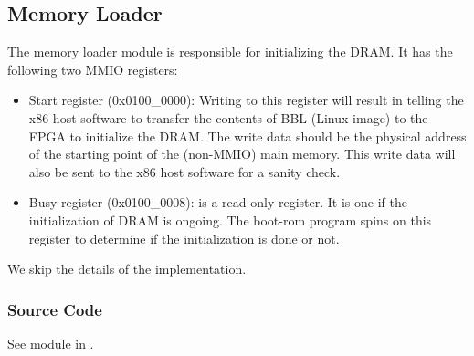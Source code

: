 \subsection{Memory Loader}
The memory loader module is responsible for initializing the DRAM.
It has the following two MMIO registers:
\begin{itemize}
    \item Start register (0x0100\_0000):
    Writing to this register will result in telling the x86 host software to transfer the contents of BBL (Linux image) to the FPGA to initialize the DRAM.
    The write data should be the physical address of the starting point of the (non-MMIO) main memory.
    This write data will also be sent to the x86 host software for a sanity check.
    \item Busy register (0x0100\_0008): is a read-only register.
    It is one if the initialization of DRAM is ongoing.
    The boot-rom program spins on this register to determine if the initialization is done or not.
\end{itemize}
We skip the details of the implementation.

\subsubsection{Source Code}
See module  in .
